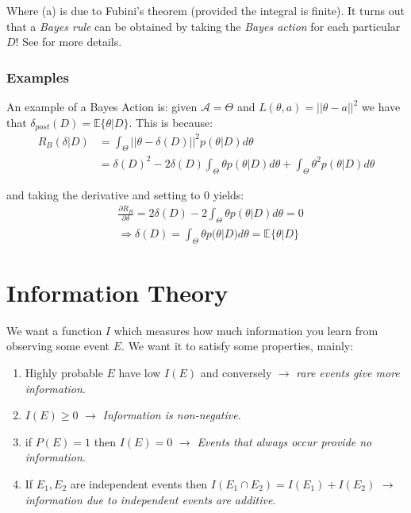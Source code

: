 \documentclass[]{article}
\begin{document}
Where (a) is due to Fubini's theorem (provided the integral is finite).
It turns out that a \emph{Bayes rule} can be obtained by taking the \emph{Bayes action} for each particular $D$! See \cite{PHoffNotes2} for more details.

\subsubsection{Examples}
An example of a Bayes Action is: given \(\mathcal{A} = \Theta\) and \(L(\theta,a) = ||\theta-a||^2\) we have that \(\delta_{post}(D) = \mathbb{E}\{\theta|D\}\). This is because:
\begin{align*}
R_B(\delta|D) &= \int_{\Theta}^{}||\theta-\delta(D)||^2p(\theta|D)d\theta \\
&=\delta(D)^2 -2\delta(D)\int_{\Theta}^{}\theta p(\theta|D)d\theta+\int_{\Theta}^{}\theta^2 p(\theta|D)d\theta
\end{align*}

and taking the derivative and setting to 0 yields:
\begin{align*}
&\frac{\partial R_B}{\partial \delta} = 2\delta(D) -2\int_{\Theta}^{}\theta p(\theta|D)d\theta = 0 \\
&\Rightarrow \delta(D) = \int_{\Theta}^{}\theta p(\theta|D)d\theta = \mathbb{E}\{\theta|D\}
\end{align*}

\newpage



\section{Information Theory}

We want a function $I$ which measures how much information you learn from observing some event $E$. We want it to satisfy some properties, mainly:

\begin{enumerate}
	\item Highly probable $E$ have low $I(E)$ and conversely $\rightarrow$ \emph{ rare events give more information}.
	\item $I(E) \ge 0$ $\rightarrow$\emph{ Information is non-negative}.
	\item if $P(E)=1$ then $I(E) = 0$ $\rightarrow$\emph{ Events that always occur provide no information}.
	\item If $E_1, E_2$ are independent events then $I(E_1 \cap E_2) = I(E_1) + I(E_2)$ $\rightarrow$\emph{ information due to independent events are additive}.
\end{enumerate}
\end{document}
